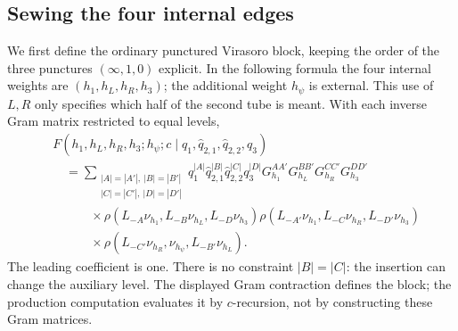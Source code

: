 \documentclass[12pt]{article}
\newcommand{\ie}{\begin{equation}\begin{aligned}}
\newcommand{\fe}{\end{aligned}\end{equation}}
\numberwithin{equation}{section}
\begin{document}
\subsection{Sewing the four internal edges}

We first define the ordinary punctured Virasoro block, keeping the order
of the three punctures $(\infty,1,0)$ explicit.  In the following formula
the four internal weights are $(h_1,h_L,h_R,h_3)$; the additional weight
$h_\psi$ is external.  This use of $L,R$ only specifies which half of the
second tube is meant.  With each inverse Gram matrix restricted to equal
levels,
\ie
 &F(h_1,h_L,h_R,h_3;h_\psi;c\mid
 q_1,\hat q_{2,1},\hat q_{2,2},q_3)\\
 &\quad=\sum_{\substack{|A|=|A'|,\ |B|=|B'|\\
                         |C|=|C'|,\ |D|=|D'|}}
 q_1^{|A|}\hat q_{2,1}^{|B|}\hat q_{2,2}^{|C|}q_3^{|D|}
 G_{h_1}^{AA'}G_{h_L}^{BB'}G_{h_R}^{CC'}G_{h_3}^{DD'}\\
 &\qquad\quad\times
 \rho(L_{-A}\nu_{h_1},L_{-B}\nu_{h_L},L_{-D}\nu_{h_3})
 \rho(L_{-A'}\nu_{h_1},L_{-C}\nu_{h_R},L_{-D'}\nu_{h_3})\\
 &\qquad\quad\times
 \rho(L_{-C'}\nu_{h_R},\nu_{h_\psi},L_{-B'}\nu_{h_L}).
 \label{punctured-vir}
\fe
The leading coefficient is one.  There is no constraint $|B|=|C|$:
the insertion can change the auxiliary level.  The displayed Gram
contraction defines the block; the production computation evaluates it
by $c$-recursion, not by constructing these Gram matrices.
\end{document}
